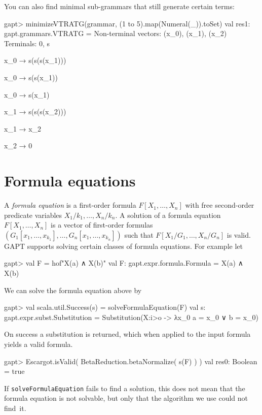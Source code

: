 \documentclass[a4paper,11pt]{book}
\begin{document}
You can also find minimal sub-grammars that still generate certain terms:
\begin{clilisting}
gapt> minimizeVTRATG(grammar, (1 to 5).map(Numeral(_)).toSet)
val res1: gapt.grammars.VTRATG =
Non-terminal vectors: (x_0), (x_1), (x_2)
Terminals: 0, s

x_0 → s(s(s(x_1)))

x_0 → s(s(x_1))

x_0 → s(x_1)

x_1 → s(s(s(x_2)))

x_1 → x_2

x_2 → 0

\end{clilisting}


\section{Formula equations}
A \emph{formula equation} is a first-order formula \(F[X_{1}, \dots, X_{n}]\) with free second-order predicate variables \(X_{1}/k_{1}, \dots, X_{n}/k_{n}\).
A solution of a formula equation \(F[X_{1}, \dots, X_{n}]\) is a vector of first-order formulas \((G_{1}[x_{1}, \dots, x_{k_{1}}], \dots, G_{n}[x_{1}, \dots, x_{k_{n}}])\) such that \(F[X_{1}/G_{1}, \dots, X_{n}/G_{n}]\) is valid.
GAPT supports solving certain classes of formula equations.
For example let
\begin{clilisting}
gapt> val F = hof"X(a) ∧ X(b)"
val F: gapt.expr.formula.Formula = X(a) ∧ X(b)

\end{clilisting}
We can solve the formula equation above by
\begin{clilisting}
gapt> val scala.util.Success(s) = solveFormulaEquation(F)
val s: gapt.expr.subst.Substitution = Substitution(X:i>o -> λx_0 a = x_0 ∨ b = x_0)

\end{clilisting}

On success a substitution is returned, which when applied to the input formula yields a valid formula.
\begin{clilisting}
gapt> Escargot.isValid( BetaReduction.betaNormalize( s(F) ) )
val res0: Boolean = true

\end{clilisting}
If \texttt{solveFormulaEquation} fails to find a solution, this does not mean that the formula equation is not solvable, but only that the algorithm we use could not find~it.
\end{document}
